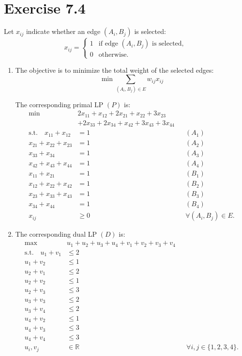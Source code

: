 \documentclass{Group_Templ}
\begin{document}
\section*{Exercise 7.4}

Let $x_{ij}$ indicate whether an edge $(A_i,B_j)$ is selected:
\[
x_{ij}=
\begin{cases}
	1 & \text{if edge }(A_i,B_j)\text{ is selected},\\
	0 & \text{otherwise}.
\end{cases}
\]

\begin{enumerate}
	\item
	The objective is to minimize the total weight of the
	selected edges:
	\[
	\min \sum_{(A_i,B_j)\in E} w_{ij}x_{ij}
	\]
	
	The corresponding primal LP $(P)$ is:
	\begin{align*}
		\min\quad
		&2x_{11}+x_{12}+2x_{21}+x_{22}+3x_{23}\\
		&+2x_{33}+2x_{34}+x_{42}+3x_{43}+3x_{44}\\
		\text{s.t.}\quad
		x_{11}+x_{12}&=1 &&(A_1)\\
		x_{21}+x_{22}+x_{23}&=1 &&(A_2)\\
		x_{33}+x_{34}&=1 &&(A_3)\\
		x_{42}+x_{43}+x_{44}&=1 &&(A_4)\\
		x_{11}+x_{21}&=1 &&(B_1)\\
		x_{12}+x_{22}+x_{42}&=1 &&(B_2)\\
		x_{23}+x_{33}+x_{43}&=1 &&(B_3)\\
		x_{34}+x_{44}&=1 &&(B_4)\\
		x_{ij}&\geq0
		&&\forall(A_i,B_j)\in E.
	\end{align*}
	
	\item
	The corresponding dual LP $(D)$ is:
	\begin{align*}
		\max\quad
		&u_1+u_2+u_3+u_4+v_1+v_2+v_3+v_4\\
		\text{s.t.}\quad
		u_1+v_1&\leq2\\
		u_1+v_2&\leq1\\
		u_2+v_1&\leq2\\
		u_2+v_2&\leq1\\
		u_2+v_3&\leq3\\
		u_3+v_3&\leq2\\
		u_3+v_4&\leq2\\
		u_4+v_2&\leq1\\
		u_4+v_3&\leq3\\
		u_4+v_4&\leq3\\
		u_i,v_j&\in\mathbb{R}
		&&\forall i,j\in\{1,2,3,4\}.
	\end{align*}
	

\end{enumerate}
\end{document}
